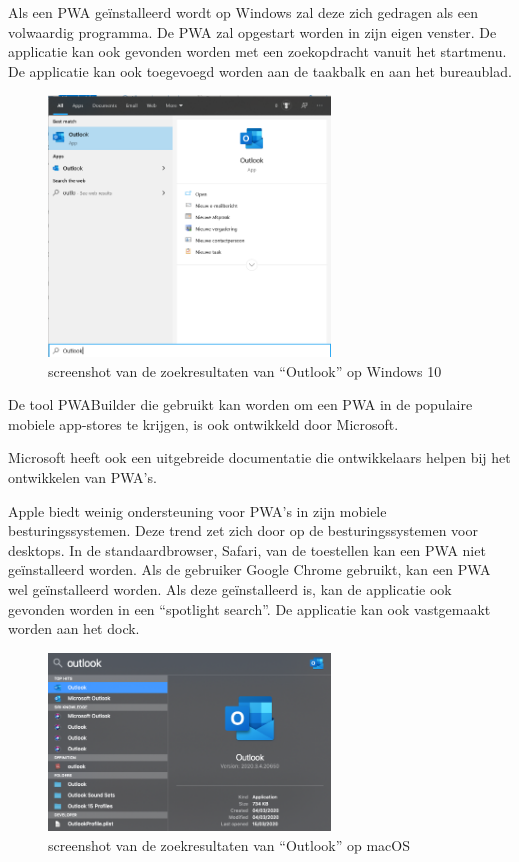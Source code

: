 		Als een PWA geïnstalleerd wordt op Windows zal deze zich gedragen als een volwaardig programma. De PWA zal opgestart worden in zijn eigen venster. De applicatie kan ook gevonden worden met een zoekopdracht vanuit het startmenu. De applicatie kan ook toegevoegd worden aan de taakbalk en aan het bureaublad.
		
		\newpage
		\begin{figure}[H]
			\centering
			\includegraphics[width=75mm]{./img/Outlook_search_windows.png}
			\caption{screenshot van de zoekresultaten van “Outlook” op Windows 10}
		\end{figure}
		
		
		De tool PWABuilder die gebruikt kan worden om een PWA in de populaire mobiele app-stores te krijgen, is ook ontwikkeld door Microsoft.
		\autocite{PWAbuilder2020}
		
		Microsoft heeft ook een uitgebreide documentatie die ontwikkelaars helpen bij het ontwikkelen van PWA's.
		\autocite{Microsoft2020b}
		
		
		Apple biedt weinig ondersteuning voor PWA's in zijn mobiele besturingssystemen. Deze trend zet zich door op de besturingssystemen voor desktops. In de standaardbrowser, Safari, van de toestellen kan een PWA niet geïnstalleerd worden. Als de gebruiker Google Chrome gebruikt, kan een PWA wel geïnstalleerd worden. Als deze geïnstalleerd is, kan de applicatie ook gevonden worden in een “spotlight search”. De applicatie kan ook vastgemaakt worden aan het dock.
		
		\begin{figure}[H]
			\centering
			\includegraphics[width=75mm]{./img/Outlook_search_mac.png}
			\caption{screenshot van de zoekresultaten van “Outlook” op macOS}
		\end{figure}
		
